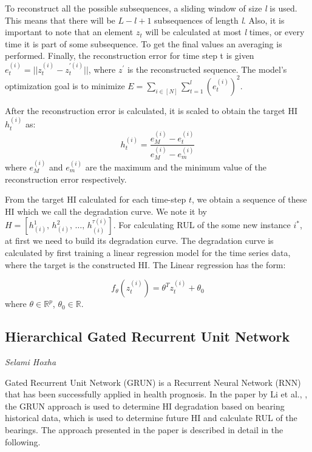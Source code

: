 To reconstruct all the possible subsequences, a sliding window of size \emph{l} is used.
This means that there will
be $L-l+1$ subsequences of length \emph{l}. Also, it is important to note that an element $z_t$ will be calculated at most \emph{l} times,
or every time it is part of some subsequence. To get the final values an averaging is performed. Finally, the
reconstruction error for time step t is given $e_t^{(i)} = ||z_t^{(i)} - z_t^{'(i)}||$, where $z^{'}$ is the reconstructed sequence.
The model's optimization goal is to minimize
$E = \sum_{i\in[N]}\sum_{t=1}^{l}{{\left( e_t^{(i)} \right)}^2}$.

After the reconstruction error is calculated, it is scaled to obtain the target HI $h_t^{(i)}$ as:
\begin{equation}
    h_t^{(i)} = \frac{e_M^{(i)}-e_t^{(i)}}{e_M^{(i)}-e_m^{(i)}}
\end{equation} where $e_M^{(i)}$ and $e_m^{(i)}$ are the maximum and the minimum value of the reconstruction error respectively.

From the target HI calculated for each time-step $t$, we obtain a sequence of these HI which we call
the degradation curve. We note it by $H = [h^1_{(i)}, \, h^2_{(i)}, \, \dots ,\, h^{\tau(i)}_{(i)}]$.
For calculating RUL of the some new instance $i^*$, at first we need to build its degradation curve. The degradation curve is calculated
by first training a linear regression model for the time series data, where the target is the constructed HI. The Linear
regression has the form:

\begin{equation}
    f_{\theta}(z_t^{(i)})  = \theta^T z_t^{(i)} + \theta_0
\end{equation} where $\theta \in \mathbb{R}^p$, $\theta_0 \in \mathbb{R}$.



\subsection{Hierarchical Gated Recurrent Unit Network}
\vspace*{-12.5mm}\hfill{\normalsize\emph{Selami Hoxha}}
\label{sec:hi_estimation:approaches:HGRUN}

Gated Recurrent Unit Network (GRUN) is a Recurrent Neural Network (RNN) that has been successfully applied in health prognosis. In the paper
by Li et al., \cite{LI2019229},
the GRUN approach is used to determine HI degradation based on bearing historical data, which is used to determine future HI and
calculate RUL of the bearings. The approach presented in the paper is described in detail in the following.\\

